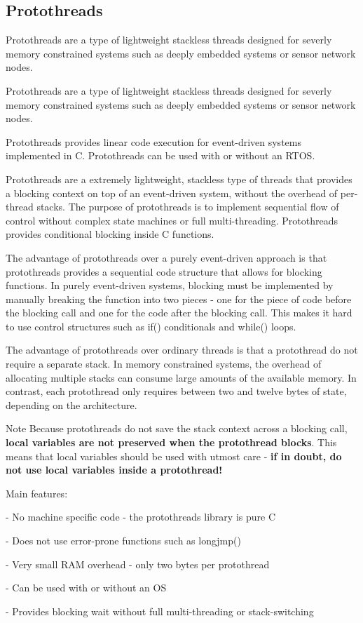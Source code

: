 \hypertarget{a00066}{}\subsection{Protothreads}
\label{a00066}


Protothreads are a type of lightweight stackless threads designed for severly memory constrained systems such as deeply embedded systems or sensor network nodes.  


Protothreads are a type of lightweight stackless threads designed for severly memory constrained systems such as deeply embedded systems or sensor network nodes. 

Protothreads provides linear code execution for event-\/driven systems implemented in C. Protothreads can be used with or without an R\+T\+OS.

Protothreads are a extremely lightweight, stackless type of threads that provides a blocking context on top of an event-\/driven system, without the overhead of per-\/thread stacks. The purpose of protothreads is to implement sequential flow of control without complex state machines or full multi-\/threading. Protothreads provides conditional blocking inside C functions.

The advantage of protothreads over a purely event-\/driven approach is that protothreads provides a sequential code structure that allows for blocking functions. In purely event-\/driven systems, blocking must be implemented by manually breaking the function into two pieces -\/ one for the piece of code before the blocking call and one for the code after the blocking call. This makes it hard to use control structures such as if() conditionals and while() loops.

The advantage of protothreads over ordinary threads is that a protothread do not require a separate stack. In memory constrained systems, the overhead of allocating multiple stacks can consume large amounts of the available memory. In contrast, each protothread only requires between two and twelve bytes of state, depending on the architecture.

\begin{DoxyNote}{Note}
Because protothreads do not save the stack context across a blocking call, {\bfseries local variables are not preserved when the protothread blocks}. This means that local variables should be used with utmost care -\/ {\bfseries if in doubt, do not use local variables inside a protothread!}
\end{DoxyNote}
Main features\+: \begin{DoxyVerb}- No machine specific code - the protothreads library is pure C

- Does not use error-prone functions such as longjmp()

- Very small RAM overhead - only two bytes per protothread

- Can be used with or without an OS

- Provides blocking wait without full multi-threading or
  stack-switching
\end{DoxyVerb}


